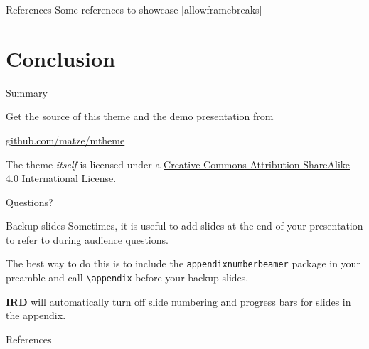 \documentclass[10pt, aspectratio=169]{beamer}
\newcommand{\themename}{\textbf{\textsc{IRD}}\xspace}
\begin{document}
\begin{frame}{References}
  Some references to showcase [allowframebreaks] \cite{knuth92,ConcreteMath,Simpson,Er01,greenwade93}
\end{frame}

\section{Conclusion}

\begin{frame}{Summary}

  Get the source of this theme and the demo presentation from

  \begin{center}\url{github.com/matze/mtheme}\end{center}

  The theme \emph{itself} is licensed under a
  \href{http://creativecommons.org/licenses/by-sa/4.0/}{Creative Commons
  Attribution-ShareAlike 4.0 International License}.

  \begin{center}\ccbysa\end{center}

\end{frame}

\begin{frame}[standout]
  Questions?
\end{frame}


\appendix

\begin{frame}[fragile]{Backup slides}
  Sometimes, it is useful to add slides at the end of your presentation to
  refer to during audience questions.

  The best way to do this is to include the \verb|appendixnumberbeamer|
  package in your preamble and call \verb|\appendix| before your backup slides.

  \themename will automatically turn off slide numbering and progress bars for
  slides in the appendix.
\end{frame}

\begin{frame}[allowframebreaks]{References}

  
  

\end{frame}
\end{document}
